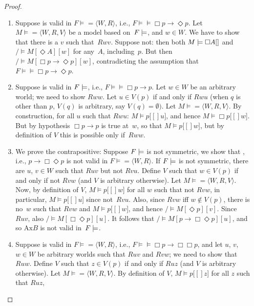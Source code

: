 \documentclass[10pt,a4paper]{article}
\theoremstyle{plain}
\theoremstyle{definition}
\theoremstyle{remark}
\providecommand{\lif}{\mathbin{\rightarrow}}
\providecommand{\Entails}{\mathrel{\models}}
\providecommand{\mSat}[3]{\ensuremath{#1 \models #2[#3]}}
\providecommand{\mModel}[2]{\ensuremath{#1 \models #2}}
\providecommand{\tuple}[1]{\langle #1 \rangle}
\providecommand{\Ax}{\mathrm{Ax}}
\begin{document}
\begin{proof}
  \begin{enumerate}
  \item Suppose \Ax{D} is valid in $\mModel{F} = \tuple{W, R}$, i.e.,
    $\mModel{F} \Entails \Box p \lif \Diamond p$. Let $\mModel{M} =
    \tuple{W, R, V}$ be a model based on~$\mModel{F}$, and $w \in
    W$. We have to show that there is a $v$ such that~$Rwv$.  Suppose
    not: then both $\mSat{M}{\Box A}$ and $\mSat/{M}{\Diamond A}[w]$
    for any~$A$, including~$p$. But then $\mSat/{M}{\Box p \lif
      \Diamond p}[w]$, contradicting the assumption that $\mModel{F}
    \Entails \Box p \lif \Diamond p$.
  \item Suppose \Ax{T} is valid in $\mModel{F}$, i.e., $\mModel{F} \Entails \Box
    p \lif p$. Let $w \in W$ be an arbitrary world; we need to show
    $Rww$. Let $u \in V(p)$ if and only if $Rwu$ (when $q$ is other
    than $p$, $V(q)$ is arbitrary, say $V(q) = \emptyset)$. Let
    $\mModel{M} = \tuple{W, R, V}$. By construction, for all $u$ such
    that $Rwu$: $\mSat{M}{p}[u]$, and hence $\mSat{M}{\Box p}[w]$. But
    by hypothesis $\Box p \lif p$ is true at~$w$, so that
    $\mSat{M}{p}[w]$, but by definition of $V$ this is possible only
    if~$Rww$.
  \item We prove the contrapositive: Suppose $\mModel{F}$ is not
    symmetric, we show that \Ax{B}, i.e., $p \lif \Box\Diamond p$ is
    not valid in $\mModel{F}= \tuple{W, R}$. If $\mModel{F}$ is not
    symmetric, there are $u$, $v \in W$ such that $Ruv$ but not
    $Rvu$. Define $V$ such that $w \in V(p)$ if and only if not $Rvw$
    (and $V$ is arbitrary otherwise). Let $\mModel{M} =\tuple{W, R,
      V}$.  Now, by definition of $V$, $\mSat{M}{p}[w]$ for all $w$
    such that not $Rvw$, in particular, $\mSat{M}{p}[u]$ since
    not~$Rvu$. Also, since $Rvw$ iff $w \notin V(p)$, there is no~$w$
    such that $Rvw$ and $\mSat{M}{p}[w]$, and hence
    $\mSat/{M}{\Diamond p}[v]$. Since~$Ruv$, also
    $\mSat/{M}{\Box\Diamond p}[u]$. It follows that $\mSat/{M}{p \lif
      \Box\Diamond p}[u]$, and so $\Ax{B}$ is not valid
    in~$\mModel{F}$.
  \item Suppose \Ax{4} is valid in $\mModel{F} = \tuple{W,R}$, i.e.,
    $\mModel{F} \Entails \Box p \lif \Box\Box p$, and let $u$, $v$, $w \in W$ be
    arbitrary worlds such that $Ruv$ and $Rvw$; we need to show that
    $Ruw$. Define $V$ such that $z \in V(p)$ if and only if $Ruz$ (and
    $V$ is arbitrary otherwise). Let $\mModel{M} =\tuple{W, R, V}$. By
    definition of $V$, $\mSat{M}{p}[z]$ for all $z$ such that $Ruz$,

\end{enumerate}
\end{proof}
\end{document}
